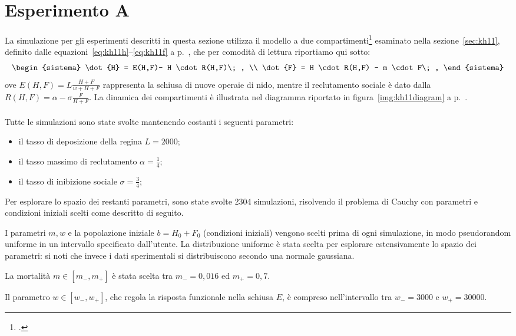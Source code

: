 \section{Esperimento A}
\label{sec:esperimentoA}
La simulazione per gli esperimenti descritti in questa sezione utilizza il modello a due compartimenti\footcite{khoury2011}
esaminato nella sezione~\ref{sec:kh11},
definito dalle equazioni~\eqref{eq:kh11h}--\eqref{eq:kh11f} a p.~\pageref{eq:kh11h}, che per comodità
di lettura riportiamo qui sotto:
$$\begin{sistema}
    \dot{H} = E(H,F)- H \cdot R(H,F)\; , \\
    \dot{F} = H \cdot R(H,F)  - m \cdot F\; ,
\end{sistema}$$
ove $E(H,F) = L \frac{H+F}{w + H + F}$ rappresenta la schiusa di nuove operaie di nido,
mentre il reclutamento sociale è dato dalla $R(H,F) = \alpha - \sigma \frac{F}{H+F}$.
La dinamica dei compartimenti è illustrata nel diagramma  riportato
in figura~\ref{img:kh11diagram} a p.~\pageref{img:kh11diagram}.

\paragraph{}
Tutte le simulazioni sono state svolte mantenendo costanti i seguenti parametri:
\begin{itemize}
    \item il tasso di deposizione della regina $L=2000$;
    \item il tasso massimo di reclutamento $\alpha = \frac{1}{4}$;
    \item il tasso di inibizione sociale $\sigma = \frac{3}{4}$;
\end{itemize}

Per esplorare lo spazio dei restanti parametri, sono state svolte 2304 simulazioni, risolvendo
il problema di Cauchy
con parametri e condizioni iniziali scelti come descritto di seguito.

I parametri $m,w$ e la popolazione iniziale $b=H_0 + F_0$ (condizioni iniziali) vengono scelti prima di ogni simulazione,
in modo pseudorandom uniforme in un intervallo specificato dall'utente. La distribuzione uniforme è stata scelta per esplorare estensivamente
lo spazio dei parametri: si noti che invece i dati sperimentali si distribuiscono secondo una normale gaussiana.

La mortalità $m \in \left[ m_-, m_+ \right]$ è stata scelta tra $m_-=0,016$ ed $m_+ =0,7$.

Il parametro $w \in \left[ w_-, w_+ \right]$, che regola la risposta funzionale nella schiusa $E$, è
compreso nell'intervallo tra $w_- = 3000$ e $w_+ = 30000$.

